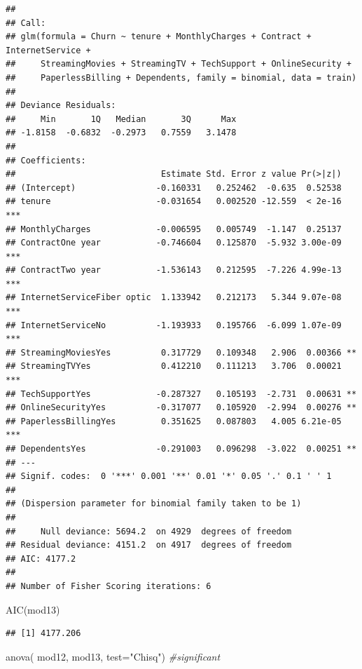 \documentclass[
  twoside]{article}
\newenvironment{Shaded}{\begin{snugshade}}{\end{snugshade}}
\newcommand{\AttributeTok}[1]{\textcolor[rgb]{0.77,0.63,0.00}{#1}}
\newcommand{\CommentTok}[1]{\textcolor[rgb]{0.56,0.35,0.01}{\textit{#1}}}
\newcommand{\FunctionTok}[1]{\textcolor[rgb]{0.00,0.00,0.00}{#1}}
\newcommand{\NormalTok}[1]{#1}
\newcommand{\StringTok}[1]{\textcolor[rgb]{0.31,0.60,0.02}{#1}}
\begin{document}
\begin{verbatim}
## 
## Call:
## glm(formula = Churn ~ tenure + MonthlyCharges + Contract + InternetService + 
##     StreamingMovies + StreamingTV + TechSupport + OnlineSecurity + 
##     PaperlessBilling + Dependents, family = binomial, data = train)
## 
## Deviance Residuals: 
##     Min       1Q   Median       3Q      Max  
## -1.8158  -0.6832  -0.2973   0.7559   3.1478  
## 
## Coefficients:
##                             Estimate Std. Error z value Pr(>|z|)    
## (Intercept)                -0.160331   0.252462  -0.635  0.52538    
## tenure                     -0.031654   0.002520 -12.559  < 2e-16 ***
## MonthlyCharges             -0.006595   0.005749  -1.147  0.25137    
## ContractOne year           -0.746604   0.125870  -5.932 3.00e-09 ***
## ContractTwo year           -1.536143   0.212595  -7.226 4.99e-13 ***
## InternetServiceFiber optic  1.133942   0.212173   5.344 9.07e-08 ***
## InternetServiceNo          -1.193933   0.195766  -6.099 1.07e-09 ***
## StreamingMoviesYes          0.317729   0.109348   2.906  0.00366 ** 
## StreamingTVYes              0.412210   0.111213   3.706  0.00021 ***
## TechSupportYes             -0.287327   0.105193  -2.731  0.00631 ** 
## OnlineSecurityYes          -0.317077   0.105920  -2.994  0.00276 ** 
## PaperlessBillingYes         0.351625   0.087803   4.005 6.21e-05 ***
## DependentsYes              -0.291003   0.096298  -3.022  0.00251 ** 
## ---
## Signif. codes:  0 '***' 0.001 '**' 0.01 '*' 0.05 '.' 0.1 ' ' 1
## 
## (Dispersion parameter for binomial family taken to be 1)
## 
##     Null deviance: 5694.2  on 4929  degrees of freedom
## Residual deviance: 4151.2  on 4917  degrees of freedom
## AIC: 4177.2
## 
## Number of Fisher Scoring iterations: 6
\end{verbatim}

\begin{Shaded}
\begin{Highlighting}[]
\FunctionTok{AIC}\NormalTok{(mod13)}
\end{Highlighting}
\end{Shaded}

\begin{verbatim}
## [1] 4177.206
\end{verbatim}

\begin{Shaded}
\begin{Highlighting}[]
\FunctionTok{anova}\NormalTok{( mod12, mod13,  }\AttributeTok{test=}\StringTok{"Chisq"}\NormalTok{) }\CommentTok{\#significant}
\end{Highlighting}
\end{Shaded}
\end{document}
